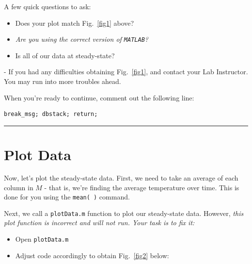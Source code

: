 \documentclass[11pt, letterpaper]{article}
\begin{document}
A few quick questions to ask:

\begin{formal}
\begin{quest} 
\begin{itemize}
    \item Does your plot match Fig.~\ref{fig1} above? 
    \item \it{Are you using the correct version of \texttt{MATLAB}?} 
    \item Is all of our data at steady-state?
\end{itemize}
\end{quest}
\end{formal}
\begin{center}
\begin{tcolorbox}[enhanced, width=14cm, top=-2mm, colback=red!5, colframe=black!50!white, boxrule=0.25pt, boxsep=2mm]
\n
{\small
{} - If you had any difficulties obtaining Fig.~\ref{fig1},  and contact your Lab Instructor. You may run into more troubles ahead.
}
\end{tcolorbox}

\end{center}

When you're ready to continue, comment out the following line:

\n
\begin{lstlisting}[numbers=none]
% remove break
break_msg; dbstack; return;
\end{lstlisting}

\n
\hrule

\section{Plot Data}

Now, let's plot the steady-state data. First, we need to take an average of each column in $M$ - that is, we're finding the average temperature over time. This is done for you using the \texttt{mean( )} command.

\n
Next, we call a \texttt{plotData.m} function to plot our steady-state data. However, \textit{this plot function is incorrect and will not run. Your task is to fix it:}

\begin{itemize}
    \item Open \texttt{plotData.m} 
    \item Adjust code accordingly to obtain Fig.~\ref{fig2} below:
\end{itemize}
\end{document}
